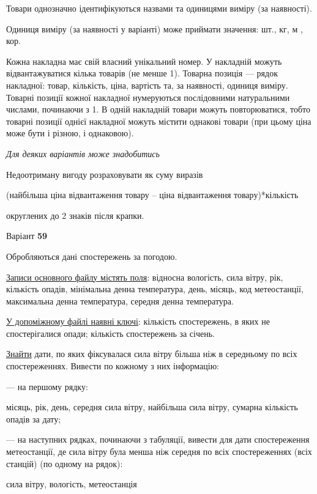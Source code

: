 \documentclass[11pt, ukrainian]{article}
\begin{document}
Товари однозначно ідентифікуються назвами та одиницями виміру (за наявності).

Одиниця виміру (за наявності у варіанті) може приймати значення: шт., кг, м , кор.

Кожна накладна має свій власний унікальний номер.
У накладній можуть відвантажуватися кілька товарів (не менше 1).
Товарна позиція --- рядок накладної: товар, кількість, ціна, вартість та, за наявності, одиниця виміру.
Товарні позиції кожної накладної нумеруються послідовними натуральними числами, починаючи з 1.
В одній накладній товари можуть повторюватися, 
тобто товарні позиції однієї накладної можуть містити однакові товари 
(при цьому ціна може бути і різною, і однаковою).

\bigskip\textit{Для деяких варіантів може знадобитись}

Недоотриману вигоду розраховувати як суму виразів
{\center (найбільша ціна відвантаження товару – ціна відвантаження товару)*кількість\par}

\bigskip
{\noindent} округлених до 2 знаків після крапки.




\par
\newpage
{\center Варіант  \No \textbf { 59 }\par}
\bigskip
Обробляються дані спостережень за погодою. 

\underline{Записи основного файлу містять поля}: відносна вологість, сила вітру, рік, кількість опадів, мінімальна денна температура, день, місяць, код метеостанції, максимальна денна температура, середня денна температура.

\underline{У допоміжному файлі наявні ключі}: кількість спостережень, в яких не спостерігалися опади; кількість спостережень за січень.

\underline{Знайти} дати, по яких фіксувалася сила вітру більша ніж в середньому по всіх спостереженнях. Вивести по кожному з них інформацію:\par
{\noindent}--- на першому рядку:\par
місяць, рік, день, середня сила вітру, найбільша сила вітру, сумарна кількість опадів за дату;

{\noindent}--- на наступних рядках, починаючи з табуляції, вивести для дати спостереження метеостанції, де сила вітру була менша ніж середня по всіх спостереженнях (всіх станцій) (по одному на рядок):\par
сила вітру, вологість, метеостанція
\end{document}
